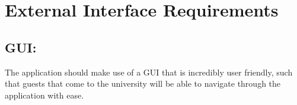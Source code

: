 \documentclass[11pt]{article}
\begin{document}
\section{External Interface Requirements}
\subsection{GUI:}
	The application should make use of a GUI that is incredibly user friendly, such that guests that come to the university will be able to navigate through the application with ease.
\end{document}
